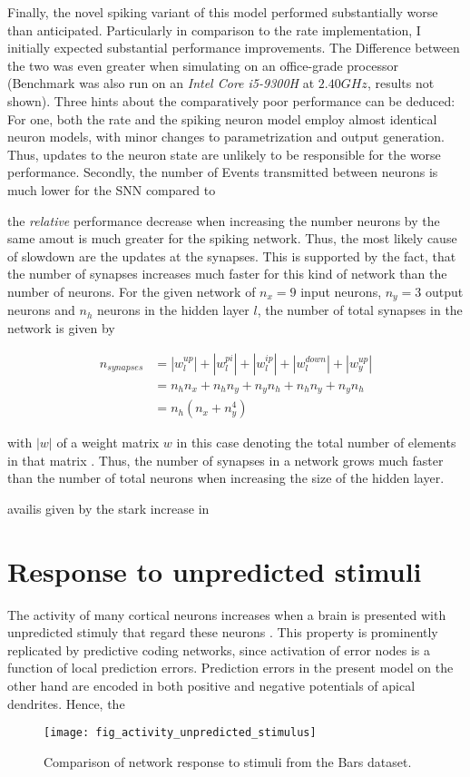 Finally, the novel spiking variant of this model performed substantially worse than anticipated. Particularly in
comparison to the rate implementation, I initially expected substantial performance improvements. The Difference between
the two was even greater when simulating on an office-grade processor (Benchmark was also run on an \textit{Intel Core
    i5-9300H} at $2.40GHz$, results not shown). Three hints about the comparatively poor performance can be deduced: For
one, both the rate and the spiking neuron model employ almost identical neuron models, with minor changes to
parametrization and output generation. Thus, updates to the neuron state are unlikely to be responsible for the worse
performance. Secondly, the number of Events transmitted between neurons is much lower for the SNN compared to

the \textit{relative} performance decrease when increasing the number neurons by the same amout is much greater for the
spiking network. Thus, the most likely cause of slowdown are the updates at the synapses. This is supported by the fact,
that the number of synapses increases much faster for this kind of network than the number of neurons. For the given
network of $n_{x} = 9$ input neurons, $n_y = 3$ output neurons and $n_{h}$ neurons in the hidden layer $l$, the number
of total synapses in the network is given by

\begin{align}
    n_{synapses} & = |w_{l}^{up}| + |w_{l}^{pi}| + |w_{l}^{ip}| + |w_{l}^{down}| + |w_{y}^{up}| \\
                 & = n_h n_x + n_h n_y + n_y n_h  + n_h n_y + n_y  n_h                          \\
                 & = n_h (n_x + n_y^4)
\end{align}

with $|w|$ of a weight matrix $w$ in this case denoting the total number of elements in that matrix . Thus, the number of synapses in a network grows much faster than the number of total
neurons when increasing the size of the hidden layer.

availis given by the stark increase in

\section{Response to unpredicted stimuli}

The activity of many cortical neurons increases when a brain is presented with unpredicted stimuly that regard these
neurons . This property is prominently replicated by
predictive coding networks, since activation of error nodes is a function of local prediction errors. Prediction errors
in the present model on the other hand are encoded in both positive and negative potentials of apical dendrites. Hence,
the

\begin{figure}[t]
    \centering
    \texttt{[image: fig\_activity\_unpredicted\_stimulus]}
    \caption{Comparison of network response to stimuli from the Bars dataset.}
    \label{fig-stimulus-response}
\end{figure}




